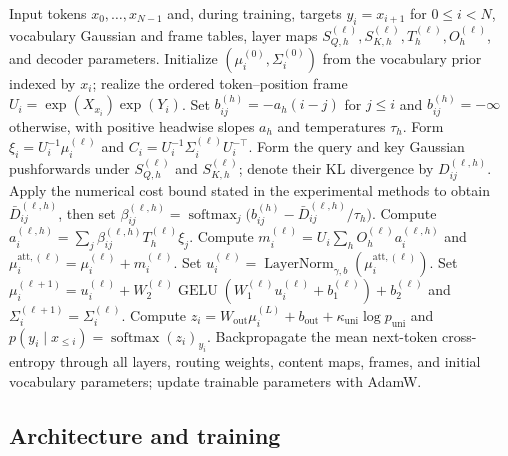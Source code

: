 \documentclass[twoside,11pt]{article}
\begin{document}
\setcounter{algorithm}{0}
\begin{algorithm}[t]
\caption{Causal Gaussian attention and supervised predictive learning}
\label{alg:predictive_content_current}
\begin{algorithmic}[1]
\REQUIRE Input tokens $x_0,\ldots,x_{N-1}$ and, during training, targets $y_i=x_{i+1}$ for $0\le i<N$, vocabulary Gaussian and frame tables, layer maps $S_{Q,h}^{(\ell)},S_{K,h}^{(\ell)},T_h^{(\ell)},O_h^{(\ell)}$, and decoder parameters.
\STATE Initialize $(\mu_i^{(0)},\Sigma_i^{(0)})$ from the vocabulary prior indexed by $x_i$; realize the ordered token--position frame $U_i=\exp(X_{x_i})\exp(Y_i)$.
\STATE Set $b_{ij}^{(h)}=-a_h(i-j)$ for $j\le i$ and $b_{ij}^{(h)}=-\infty$ otherwise, with positive headwise slopes $a_h$ and temperatures $\tau_h$.
\STATE Form $\xi_i=U_i^{-1}\mu_i^{(\ell)}$ and $C_i=U_i^{-1}\Sigma_i^{(\ell)}U_i^{-\top}$.
\STATE Form the query and key Gaussian pushforwards under $S_{Q,h}^{(\ell)}$ and $S_{K,h}^{(\ell)}$; denote their KL divergence by $D_{ij}^{(\ell,h)}$.
\STATE Apply the numerical cost bound stated in the experimental methods to obtain $\bar D_{ij}^{(\ell,h)}$, then set $\beta_{ij}^{(\ell,h)}=\operatorname{softmax}_{j}\bigl(b_{ij}^{(h)}-\bar D_{ij}^{(\ell,h)}/\tau_h\bigr)$.
\STATE Compute $a_i^{(\ell,h)}=\sum_j\beta_{ij}^{(\ell,h)}T_h^{(\ell)}\xi_j$.
\ENDFOR
\STATE Compute $m_i^{(\ell)}=U_i\sum_h O_h^{(\ell)}a_i^{(\ell,h)}$ and $\mu_i^{\mathrm{att},(\ell)}=\mu_i^{(\ell)}+m_i^{(\ell)}$.
\STATE Set $u_i^{(\ell)}=\operatorname{LayerNorm}_{\gamma,b}(\mu_i^{\mathrm{att},(\ell)})$.
\STATE Set $\mu_i^{(\ell+1)}=u_i^{(\ell)}+W_2^{(\ell)}\operatorname{GELU}(W_1^{(\ell)}u_i^{(\ell)}+b_1^{(\ell)})+b_2^{(\ell)}$ and $\Sigma_i^{(\ell+1)}=\Sigma_i^{(\ell)}$.
\ENDFOR
\STATE Compute $z_i=W_{\mathrm{out}}\mu_i^{(L)}+b_{\mathrm{out}}+\kappa_{\mathrm{uni}}\log p_{\mathrm{uni}}$ and $p(y_i\mid x_{\le i})=\operatorname{softmax}(z_i)_{y_i}$.
\STATE Backpropagate the mean next-token cross-entropy through all layers, routing weights, content maps, frames, and initial vocabulary parameters; update trainable parameters with AdamW.
\ENDIF
\end{algorithmic}
\end{algorithm}
\FloatBarrier

\subsection{Architecture and training}
\label{sec:relational_run}
\end{document}
